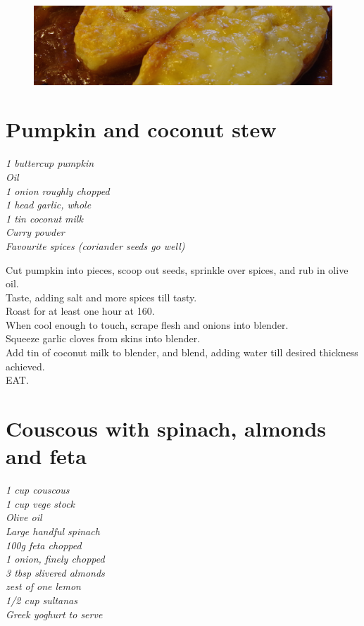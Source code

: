 \documentclass{tufte-book}
\begin{document}
\begin{figure}[h]
  \includegraphics[width=\linewidth]{onionsoup.JPG}
\end{figure}

\newpage

\section{Pumpkin and coconut stew}

\emph{1 buttercup pumpkin
\\Oil
\\1 onion roughly chopped
\\1 head garlic, whole
\\1 tin coconut milk
\\Curry powder
\\Favourite spices (coriander seeds go well)
}

\smallskip
Cut pumpkin into pieces, scoop out seeds, sprinkle over spices, and rub in olive oil.
\\Taste, adding salt and more spices till tasty.
\\Roast for at least one hour at 160\celsius.
\\When cool enough to touch, scrape flesh and onions into blender.
\\Squeeze garlic cloves from skins into blender.
\\Add tin of coconut milk to blender, and blend, adding water till desired thickness achieved.
\\EAT.



\section{Couscous with spinach, almonds and feta}

\emph{1 cup couscous
\\1 cup vege stock
\\Olive oil
\\Large handful spinach
\\100g feta chopped
\\1 onion, finely chopped
\\3 tbsp slivered almonds
\\zest of one lemon
\\1/2 cup sultanas
\\Greek yoghurt to serve
}
\end{document}
